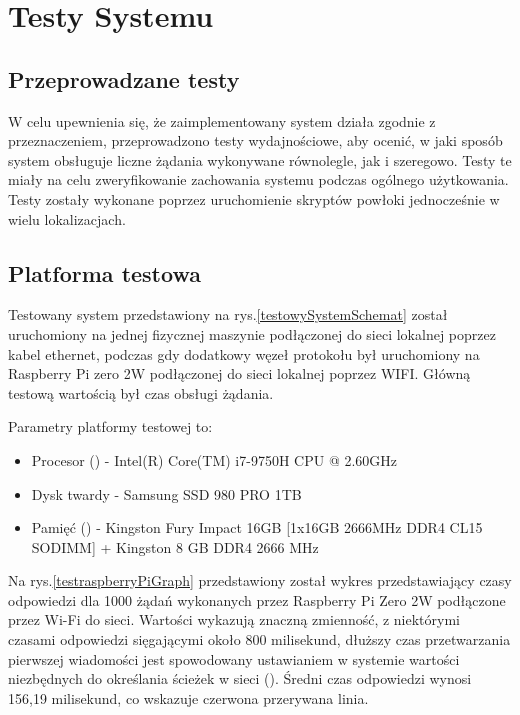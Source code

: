\chapter{Testy Systemu}

\section{Przeprowadzane testy}

W celu upewnienia się, że zaimplementowany system działa zgodnie z przeznaczeniem, przeprowadzono testy wydajnościowe, aby ocenić, w jaki sposób system obsługuje liczne żądania wykonywane równolegle, jak i szeregowo. Testy te miały na celu zweryfikowanie zachowania systemu podczas ogólnego użytkowania. Testy zostały wykonane poprzez uruchomienie skryptów powłoki jednocześnie w wielu lokalizacjach.

\section{Platforma testowa}

Testowany system przedstawiony na rys.\ref{testowySystemSchemat} został uruchomiony na jednej fizycznej maszynie podłączonej do sieci lokalnej poprzez kabel ethernet, podczas gdy dodatkowy węzeł protokołu był uruchomiony na Raspberry Pi zero 2W podłączonej do sieci lokalnej poprzez WIFI. Główną testową wartością był czas obsługi żądania.

Parametry platformy testowej to:

\begin{itemize}
    \item Procesor  () - Intel(R) Core(TM) i7-9750H CPU @ 2.60GHz
    \item Dysk twardy - Samsung SSD 980 PRO 1TB
    \item Pamięć  () - Kingston Fury Impact 16GB [1x16GB 2666MHz DDR4 CL15 SODIMM] + Kingston 8 GB DDR4 2666 MHz
\end{itemize}


%     

Na rys.\ref{testraspberryPiGraph} przedstawiony został wykres przedstawiający czasy odpowiedzi dla 1000 żądań wykonanych przez Raspberry Pi Zero 2W podłączone przez Wi-Fi do sieci. Wartości wykazują znaczną zmienność, z niektórymi czasami odpowiedzi sięgającymi około 800 milisekund, dłuższy czas przetwarzania pierwszej wiadomości jest spowodowany ustawianiem w systemie wartości niezbędnych do określania ścieżek w sieci  (). Średni czas odpowiedzi wynosi 156,19 milisekund, co wskazuje czerwona przerywana linia.

